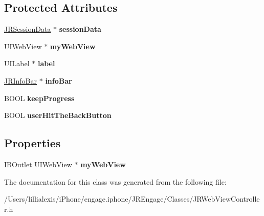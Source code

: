 \subsection*{Protected Attributes}
\begin{DoxyCompactItemize}
\item 
\hypertarget{interface_j_r_web_view_controller_a3508c15d6ce58eb60b87fc568cf21451}{
\hyperlink{interface_j_r_session_data}{JRSessionData} $\ast$ {\bfseries sessionData}}
\label{interface_j_r_web_view_controller_a3508c15d6ce58eb60b87fc568cf21451}

\item 
\hypertarget{interface_j_r_web_view_controller_a4337be8268b3bc933e4775e62c379829}{
UIWebView $\ast$ {\bfseries myWebView}}
\label{interface_j_r_web_view_controller_a4337be8268b3bc933e4775e62c379829}

\item 
\hypertarget{interface_j_r_web_view_controller_aacef2458817ca432095dc9c762c3be57}{
UILabel $\ast$ {\bfseries label}}
\label{interface_j_r_web_view_controller_aacef2458817ca432095dc9c762c3be57}

\item 
\hypertarget{interface_j_r_web_view_controller_a203e2665185dc2b8f6a976f1acda7a0a}{
\hyperlink{interface_j_r_info_bar}{JRInfoBar} $\ast$ {\bfseries infoBar}}
\label{interface_j_r_web_view_controller_a203e2665185dc2b8f6a976f1acda7a0a}

\item 
\hypertarget{interface_j_r_web_view_controller_aeb62c778cce658cc61bf57052de1b6c6}{
BOOL {\bfseries keepProgress}}
\label{interface_j_r_web_view_controller_aeb62c778cce658cc61bf57052de1b6c6}

\item 
\hypertarget{interface_j_r_web_view_controller_a82e49e409c6fcc9031e14245f70e11cd}{
BOOL {\bfseries userHitTheBackButton}}
\label{interface_j_r_web_view_controller_a82e49e409c6fcc9031e14245f70e11cd}

\end{DoxyCompactItemize}
\subsection*{Properties}
\begin{DoxyCompactItemize}
\item 
\hypertarget{interface_j_r_web_view_controller_af561b292e912a620f05b466f6f0a7354}{
IBOutlet UIWebView $\ast$ {\bfseries myWebView}}
\label{interface_j_r_web_view_controller_af561b292e912a620f05b466f6f0a7354}

\end{DoxyCompactItemize}


The documentation for this class was generated from the following file:\begin{DoxyCompactItemize}
\item 
/Users/lillialexis/iPhone/engage.iphone/JREngage/Classes/JRWebViewController.h\end{DoxyCompactItemize}
